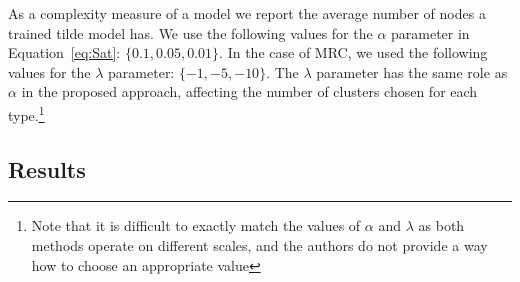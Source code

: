 As a complexity measure of a model we report the average number of nodes a trained \gls{tilde} model has.
We use the following values for the $\alpha$ parameter in Equation~\ref{eq:Sat}: $\{ 0.1,0.05, 0.01 \}$.
In the case of MRC, we used the following values for the $\lambda$ parameter: $\{-1,-5,-10\}$.
The $\lambda$ parameter has the same role as $\alpha$ in the proposed approach, affecting the number of clusters chosen for each type.\footnote{Note that it is difficult to exactly match the values of $\alpha$ and $\lambda$ as both methods operate on different scales, and the authors do not provide a way how to choose an appropriate value}




\subsection*{Results}


